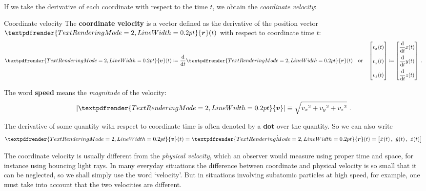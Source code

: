 \documentclass[a4paper,12pt,%
onecolumn,oneside,%
british%
]{memoir}
\renewcommand*{\bm}[1]{\textpdfrender{TextRenderingMode=2,LineWidth=0.2pt}{\boldsymbol{#1}}}
\newcommand*{\di}{\mathrm{d}}%
\newcommand*{\defd}{\coloneqq}
\DeclarePairedDelimiter\abs{\lvert}{\rvert}
\renewcommand*{\|}[1][]{\nonscript\:#1\vert\nonscript\:\mathopen{}}
\newcommand*{\yr}{\bm{r}}
\newcommand*{\yv}{\bm{v}}
\newcommand*{\dt}{\di t}
\begin{document}
If we take the derivative of each coordinate with respect to the time $t$, we obtain the \emph{coordinate velocity}:

\begin{definition}{Coordinate velocity}\label{def:coord_velocity}
  The \textbf{coordinate velocity} is a vector defined as the derivative of the position vector $\yr(t)$ with respect to coordinate time $t$:
  \begin{equation*}
    \yv(t) %
    \defd \frac{\di}{\dt}\yr(t)
    \quad\text{or}\quad
    \begin{bmatrix}
      v_{x}(t)\vphantom{\dfrac{\di}{\dt}}\\[3\jot]
      v_{y}(t)\vphantom{\dfrac{\di}{\dt}}\\[3\jot]
      v_{z}(t)\vphantom{\dfrac{\di}{\dt}}
    \end{bmatrix}
    \defd
    \begin{bmatrix}
      \dfrac{\di}{\dt} x(t)\\[3\jot]
      \dfrac{\di}{\dt} y(t)\\[3\jot]
      \dfrac{\di}{\dt} z(t)
    \end{bmatrix} \ .
  \end{equation*}

  \smallskip

  The word \textbf{speed} means the \emph{magnitude} of the velocity:
  \begin{equation*}
    \abs{\yv} \equiv \sqrt{{v_{x}}^{2} + {v_{y}}^{2} + {v_{z}}^{2}} \ .
  \end{equation*}

  \smallskip

    The derivative of some quantity with respect to coordinate time is often denoted by a \textbf{dot} over the quantity. So we can also write
    \begin{equation*}
      \yv(t) = \dot{\yr}(t) = \bigl[\dot{x}(t)\,,\ \dot{y}(t)\,,\ \dot{z}(t)\bigr]
    \end{equation*}
  \end{definition}
The coordinate velocity is usually different from the \emph{physical velocity}, which an observer would measure using proper time and space, for instance using bouncing light rays. In many everyday situations the difference between coordinate and physical velocity is so small that it can be neglected, so we shall simply use the word \enquote*{velocity}. But in situations involving subatomic particles at high speed, for example, one must take into account that the two velocities are different.
\end{document}

